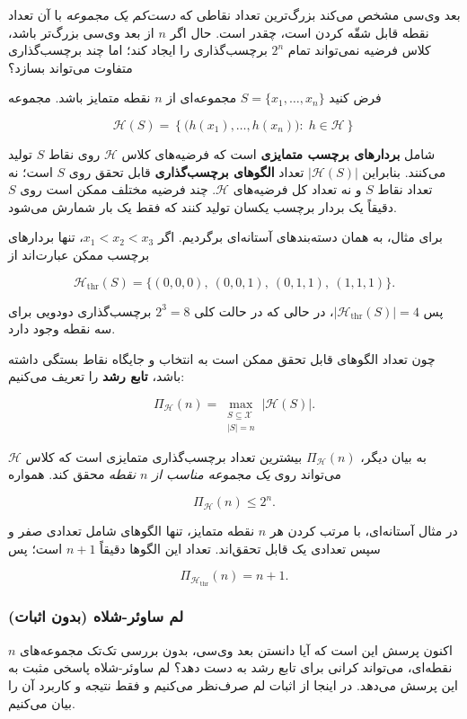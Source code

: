 \documentclass[12pt,a4paper]{article}
\begin{document}
بعد وی‌سی مشخص می‌کند بزرگ‌ترین تعداد نقاطی که
\emph{دست‌کم یک مجموعه} با آن تعداد نقطه قابل شقّه کردن است،
چقدر است. حال اگر $n$ از بعد وی‌سی بزرگ‌تر باشد،
کلاس فرضیه نمی‌تواند تمام $2^n$ برچسب‌گذاری را ایجاد کند؛
اما چند برچسب‌گذاری متفاوت می‌تواند بسازد؟

فرض کنید $S=\{x_1,\ldots,x_n\}$ مجموعه‌ای از
$n$ نقطه متمایز باشد. مجموعه

\[
\mathcal{H}(S)=
\left\{
\bigl(h(x_1),\ldots,h(x_n)\bigr)
:\;h\in\mathcal{H}
\right\}
\]

شامل \textbf{بردارهای برچسب متمایزی} است که فرضیه‌های
کلاس $\mathcal{H}$ روی نقاط $S$ تولید می‌کنند.
بنابراین $|\mathcal{H}(S)|$ تعداد \textbf{الگوهای برچسب‌گذاری}
قابل تحقق روی $S$ است؛ نه تعداد نقاط $S$
و نه تعداد کل فرضیه‌های $\mathcal{H}$.
چند فرضیه مختلف ممکن است روی $S$ دقیقاً
یک بردار برچسب یکسان تولید کنند که فقط یک بار شمارش می‌شود.

برای مثال، به همان دسته‌بندهای آستانه‌ای برگردیم.
اگر $x_1<x_2<x_3$، تنها بردارهای برچسب ممکن عبارت‌اند از

\[
\mathcal{H}_{\mathrm{thr}}(S)=
\bigl\{
(0,0,0),\ (0,0,1),\ (0,1,1),\ (1,1,1)
\bigr\}.
\]

پس $|\mathcal{H}_{\mathrm{thr}}(S)|=4$،
در حالی که در حالت کلی $2^3=8$ برچسب‌گذاری
دودویی برای سه نقطه وجود دارد.

چون تعداد الگوهای قابل تحقق ممکن است به
انتخاب و جایگاه نقاط بستگی داشته باشد،
\textbf{تابع رشد}  را تعریف می‌کنیم:

\[
\boxed{
\Pi_{\mathcal{H}}(n)=
\max_{\substack{S\subseteq\mathcal{X}\\|S|=n}}
|\mathcal{H}(S)|.
}
\]

به بیان دیگر، $\Pi_{\mathcal{H}}(n)$ بیشترین تعداد
برچسب‌گذاری متمایزی است که کلاس $\mathcal{H}$
می‌تواند روی \emph{یک مجموعه مناسب از $n$ نقطه}
محقق کند. همواره

\[
\Pi_{\mathcal{H}}(n)\leq 2^n.
\]

در مثال آستانه‌ای، با مرتب کردن هر $n$ نقطه متمایز،
تنها الگوهای شامل تعدادی صفر و سپس تعدادی یک
قابل تحقق‌اند. تعداد این الگوها دقیقاً $n+1$ است؛ پس

\[
\boxed{\Pi_{\mathcal{H}_{\mathrm{thr}}}(n)=n+1.}
\]

\subsubsection{لم ساوئر-شلاه (بدون اثبات)}

اکنون پرسش این است که آیا دانستن بعد وی‌سی،
بدون بررسی تک‌تک مجموعه‌های $n$ نقطه‌ای،
می‌تواند کرانی برای تابع رشد به دست دهد؟
لم ساوئر-شلاه 
پاسخی مثبت به این پرسش می‌دهد.
در اینجا از اثبات لم صرف‌نظر می‌کنیم
و فقط نتیجه و کاربرد آن را بیان می‌کنیم.
\end{document}
